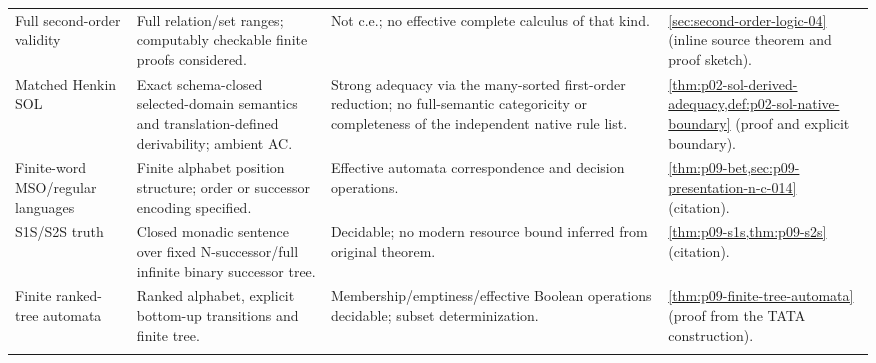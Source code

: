 \begin{landscape}
\begin{longtable}{@{}p{.18\linewidth}p{.25\linewidth}p{.23\linewidth}p{.26\linewidth}@{}}
Full second-order validity & Full relation/set ranges; computably checkable finite proofs considered. & Not c.e.; no effective complete calculus of that kind. & \cref{sec:second-order-logic-04} (inline source theorem and proof sketch).\\\addlinespace
Matched Henkin SOL & Exact schema-closed selected-domain semantics and translation-defined derivability; ambient AC. & Strong adequacy via the many-sorted first-order reduction; no full-semantic categoricity or completeness of the independent native rule list. & \cref{thm:p02-sol-derived-adequacy,def:p02-sol-native-boundary} (proof and explicit boundary).\\\addlinespace
Finite-word MSO/regular languages & Finite alphabet position structure; order or successor encoding specified. & Effective automata correspondence and decision operations. & \cref{thm:p09-bet,sec:p09-presentation-n-c-014} (citation).\\\addlinespace
S1S/S2S truth & Closed monadic sentence over fixed N-successor/full infinite binary successor tree. & Decidable; no modern resource bound inferred from original theorem. & \cref{thm:p09-s1s,thm:p09-s2s} (citation).\\\addlinespace
Finite ranked-tree automata & Ranked alphabet, explicit bottom-up transitions and finite tree. & Membership/emptiness/effective Boolean operations decidable; subset determinization. & \cref{thm:p09-finite-tree-automata} (proof from the TATA construction).\\\addlinespace
\end{longtable}
\endgroup
\end{landscape}

